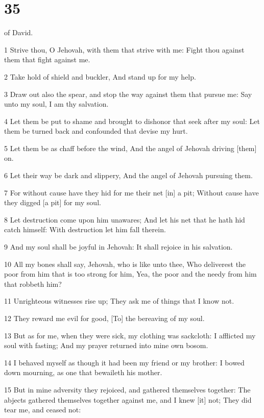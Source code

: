 \chapter{35}

\par [A Psalm] of David.

\par 1 Strive thou, O Jehovah, with them that strive with me: Fight thou against them that fight against me.
\par 2 Take hold of shield and buckler, And stand up for my help.
\par 3 Draw out also the spear, and stop the way against them that pursue me: Say unto my soul, I am thy salvation.
\par 4 Let them be put to shame and brought to dishonor that seek after my soul: Let them be turned back and confounded that devise my hurt.
\par 5 Let them be as chaff before the wind, And the angel of Jehovah driving [them] on.
\par 6 Let their way be dark and slippery, And the angel of Jehovah pursuing them.
\par 7 For without cause have they hid for me their net [in] a pit; Without cause have they digged [a pit] for my soul.
\par 8 Let destruction come upon him unawares; And let his net that he hath hid catch himself: With destruction let him fall therein.
\par 9 And my soul shall be joyful in Jehovah: It shall rejoice in his salvation.
\par 10 All my bones shall say, Jehovah, who is like unto thee, Who deliverest the poor from him that is too strong for him, Yea, the poor and the needy from him that robbeth him?
\par 11 Unrighteous witnesses rise up; They ask me of things that I know not.
\par 12 They reward me evil for good, [To] the bereaving of my soul.
\par 13 But as for me, when they were sick, my clothing was sackcloth: I afflicted my soul with fasting; And my prayer returned into mine own bosom.
\par 14 I behaved myself as though it had been my friend or my brother: I bowed down mourning, as one that bewaileth his mother.
\par 15 But in mine adversity they rejoiced, and gathered themselves together: The abjects gathered themselves together against me, and I knew [it] not; They did tear me, and ceased not:
